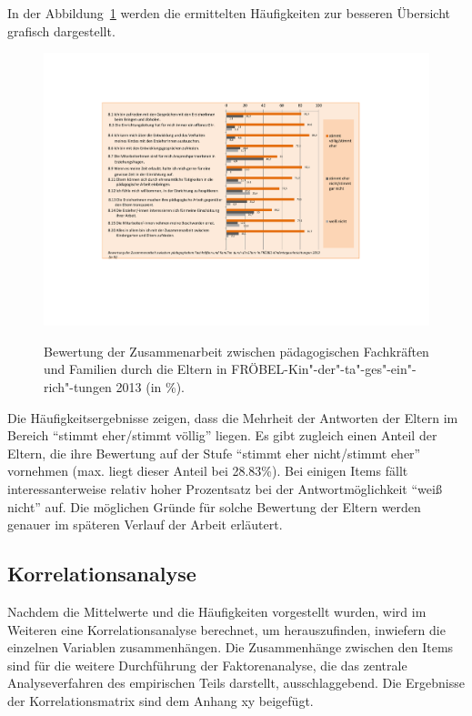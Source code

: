 \documentclass[12pt,a4paper]{article}
\begin{document}
	In der Abbildung~\ref{fig_freq} werden die ermittelten Häufigkeiten zur besseren Übersicht  grafisch dargestellt.

\begin{figure}[h]
\caption{Bewertung der Zusammenarbeit zwischen pädagogischen Fachkräften und Familien durch die Eltern in FRÖBEL-Kin"-der"-ta"-ges"-ein"-rich"-tungen 2013 (in \%).}
\centering
\includegraphics[scale=0.7]{figures/freq_dist3}
\label{fig_freq}
\end{figure}
\FloatBarrier
Die Häufigkeitsergebnisse zeigen, dass die Mehrheit der Antworten der Eltern im Bereich "`stimmt eher/stimmt völlig"' liegen. Es gibt zugleich einen Anteil der Eltern, die ihre Bewertung auf der Stufe "`stimmt eher nicht/stimmt eher"' vornehmen (max. liegt dieser Anteil bei 28.83\%). Bei einigen Items fällt interessanterweise relativ hoher Prozentsatz bei der Antwortmöglichkeit "`weiß nicht"' auf. Die möglichen Gründe für solche Bewertung der Eltern werden genauer im späteren Verlauf der Arbeit erläutert.

\subsection{Korrelationsanalyse}
\label{korr}  
Nachdem die Mittelwerte und die Häufigkeiten vorgestellt wurden, wird im Weiteren eine Korrelationsanalyse berechnet, um herauszufinden, inwiefern die einzelnen Variablen zusammenhängen. Die Zusammenhänge zwischen den Items sind für die weitere Durchführung der Faktorenanalyse, die das zentrale Analyseverfahren des empirischen Teils darstellt, ausschlaggebend. Die Ergebnisse der Korrelationsmatrix sind dem Anhang xy beigefügt.
\end{document}
